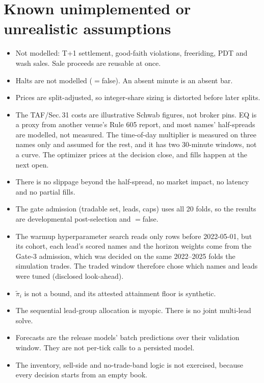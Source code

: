 \documentclass[11pt]{article}
\newcommand{\code}[1]{\path{#1}}
\begin{document}
\section{Known unimplemented or unrealistic assumptions}
\begin{itemize}
\item Not modelled: T+1 settlement, good-faith violations, freeriding, PDT
  and wash sales. Sale proceeds are reusable at once.
\item Halts are not modelled (\code{halted}$=$false). An absent minute is an
  absent bar.
\item Prices are split-adjusted, so integer-share sizing is distorted before
  later splits.
\item The TAF/Sec.\,31 costs are illustrative Schwab figures, not broker
  pins. EQ is a proxy from another venue's Rule 605 report, and most names'
  half-spreads are modelled, not measured. The time-of-day multiplier is
  measured on three names only and assumed for the rest, and it has two
  30-minute windows, not a curve. The
  optimizer prices at the decision close, and fills happen at the next
  open.
\item There is no slippage beyond the half-spread, no market impact, no
  latency and no partial fills.
\item The gate admission (tradable set, leads, caps) uses all 20 folds, so
  the results are developmental post-selection and
  \code{deployment_eligible}$=$false.
\item The warmup hyperparameter search reads only rows before 2022-05-01, but
  its cohort, each lead's scored names and the horizon weights come from the
  Gate-3 admission, which was decided on the same 2022--2025 folds the
  simulation trades. The traded window therefore chose which names and leads
  were tuned (disclosed look-ahead).
\item $\tilde\pi_i$ is not a bound, and its attested attainment floor is
  synthetic.
\item The sequential lead-group allocation is myopic. There is no joint
  multi-lead solve.
\item Forecasts are the release models' batch predictions over their
  validation window. They are not per-tick calls to a persisted model.
\item The inventory, sell-side and no-trade-band logic is not exercised,
  because every decision starts from an empty book.
\end{itemize}
\end{document}
